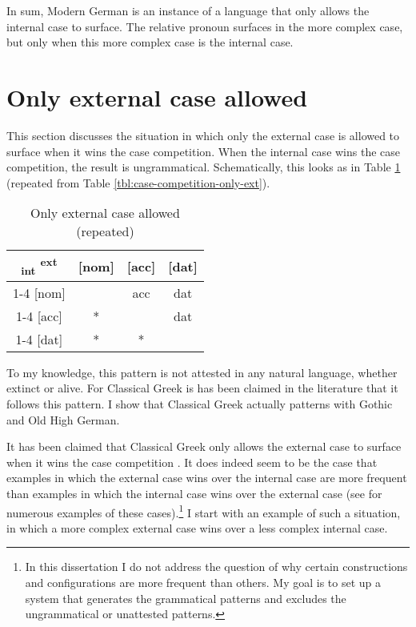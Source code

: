 In sum, Modern German is an instance of a language that only allows the internal case to surface. The relative pronoun surfaces in the more complex case, but only when this more complex case is the internal case.




\section{Only external case allowed}\label{sec:pattern-iii}

This section discusses the situation in which only the external case is allowed to surface when it wins the case competition. When the internal case wins the case competition, the result is ungrammatical. Schematically, this looks as in Table \ref{tbl:case-competition-only-ext-repeated} (repeated from Table \ref{tbl:case-competition-only-ext}).

\begin{table}[H]
  \center
  \caption{Only external case allowed (repeated)}
  \begin{tabular}{c|c|c|c}
    \toprule
    \textsubscript{\ac{int}} \textsuperscript{\ac{ext}}
           & [\ac{nom}]
           & [\ac{acc}]
           & [\ac{dat}]
           \\ \cmidrule{1-4}
       [\ac{nom}]
           & \xcancel{\phantom{xx}}
           & \ac{acc}
           & \ac{dat}
           \\ \cmidrule{1-4}
       [\ac{acc}]
           & *
           & \xcancel{\phantom{xx}}
           & \ac{dat}
           \\ \cmidrule{1-4}
       [\ac{dat}]
           & *
           & *
           & \xcancel{\phantom{xx}}
           \\
     \bottomrule
  \end{tabular}
    \label{tbl:case-competition-only-ext-repeated}
\end{table}

To my knowledge, this pattern is not attested in any natural language, whether extinct or alive. For Classical Greek is has been claimed in the literature that it follows this pattern. I show that Classical Greek actually patterns with Gothic and Old High German.

It has been claimed that Classical Greek only allows the external case to surface when it wins the case competition  \citep[cf.][]{cinqueforthcoming}.
It does indeed seem to be the case that examples in which the external case wins over the internal case are more frequent than examples in which the internal case wins over the external case (see \citealt{kakarikos2014} for numerous examples of these cases).\footnote{
In this dissertation I do not address the question of why certain constructions and configurations are more frequent than others. My goal is to set up a system that generates the grammatical patterns and excludes the ungrammatical or unattested patterns.
} I start with an example of such a situation, in which a more complex external case wins over a less complex internal case.

